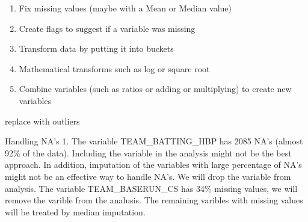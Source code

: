\documentclass[]{article}
\newenvironment{Shaded}{\begin{snugshade}}{\end{snugshade}}
\newcommand{\KeywordTok}[1]{\textcolor[rgb]{0.13,0.29,0.53}{\textbf{#1}}}
\newcommand{\DecValTok}[1]{\textcolor[rgb]{0.00,0.00,0.81}{#1}}
\newcommand{\FloatTok}[1]{\textcolor[rgb]{0.00,0.00,0.81}{#1}}
\newcommand{\StringTok}[1]{\textcolor[rgb]{0.31,0.60,0.02}{#1}}
\newcommand{\ControlFlowTok}[1]{\textcolor[rgb]{0.13,0.29,0.53}{\textbf{#1}}}
\newcommand{\OperatorTok}[1]{\textcolor[rgb]{0.81,0.36,0.00}{\textbf{#1}}}
\newcommand{\NormalTok}[1]{#1}
\providecommand{\tightlist}{%
  \setlength{\itemsep}{0pt}\setlength{\parskip}{0pt}}
\begin{document}
\begin{enumerate}
\def\labelenumi{\alph{enumi}.}
\tightlist
\item
  Fix missing values (maybe with a Mean or Median value)\\
\item
  Create flags to suggest if a variable was missing\\
\item
  Transform data by putting it into buckets\\
\item
  Mathematical transforms such as log or square root\\
\item
  Combine variables (such as ratios or adding or multiplying) to create
  new variables
\end{enumerate}

replace with outliers

\begin{Shaded}
\end{Shaded}

Handling NA's 1. The variable TEAM\_BATTING\_HBP has 2085 NA's (almost
92\% of the data). Including the variable in the analysis might not be
the best approach. In addition, imputation of the variables with large
percentage of NA's might not be an effective way to handle NA's. We will
drop the variable from analysis. The variable TEAM\_BASERUN\_CS has 34\%
missing values, we will remove the varible from the analusis. The
remaining varibles with missing values will be treated by median
imputation.
\end{document}
